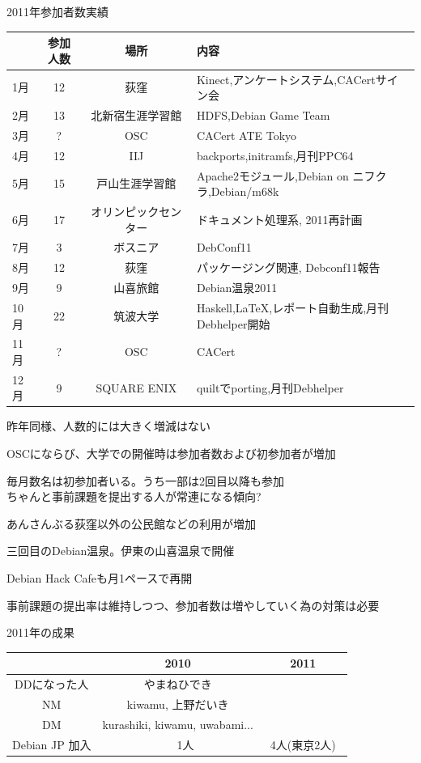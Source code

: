 \begin{frame}{2011年参加者数実績}

{\tiny
  \begin{tabular}{|l|c|c|l|}
 \hline
 & 参加人数 & 場所 & 内容\\
 \hline
1月 & 12 & 荻窪 & Kinect,アンケートシステム,CACertサイン会 \\
2月 & 13 & 北新宿生涯学習館 & HDFS,Debian Game Team \\
3月 & ? & OSC & CACert ATE Tokyo \\
4月 & 12 & IIJ & backports,initramfs,月刊PPC64 \\
5月 & 15 & 戸山生涯学習館 & Apache2モジュール,Debian on ニフクラ,Debian/m68k \\
6月 & 17 & オリンピックセンター　& ドキュメント処理系, 2011再計画 \\
7月 & 3 & ボスニア & DebConf11 \\
8月 & 12 & 荻窪 & パッケージング関連, Debconf11報告 \\
9月 & 9 & 山喜旅館 & Debian温泉2011 \\
10月 & 22 & 筑波大学 & Haskell,LaTeX,レポート自動生成,月刊Debhelper開始 \\
11月 & ? & OSC & CACert \\
12月 & 9 & SQUARE ENIX & quiltでporting,月刊Debhelper \\
 \hline
  \end{tabular}
}

\begin{itemize}
{\scriptsize
\item 昨年同様、人数的には大きく増減はない
\item OSCにならび、大学での開催時は参加者数および初参加者が増加
\item 毎月数名は初参加者いる。うち一部は2回目以降も参加\\
  ちゃんと事前課題を提出する人が常連になる傾向?
\item あんさんぶる荻窪以外の公民館などの利用が増加
\item 三回目のDebian温泉。伊東の山喜温泉で開催
\item Debian Hack Cafeも月1ペースで再開
}
\end{itemize}
事前課題の提出率は維持しつつ、参加者数は増やしていく為の対策は必要
\end{frame}

\begin{frame}{2011年の成果}

{\tiny
\begin{tabular}{|c|c|c|}
\hline
& 2010 & 2011 \\
\hline
DDになった人 & やまねひでき & \\
NM & kiwamu, 上野だいき & \\
DM & kurashiki, kiwamu, uwabami... &\\
Debian JP 加入 &　 1人 & 4人(東京2人)　\\
\hline
\end{tabular}
} 
\end{frame}

